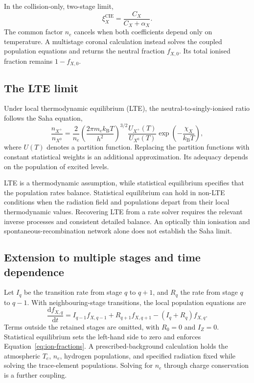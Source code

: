 In the collision-only, two-stage limit,
\begin{equation}
 \xi_X^{\mathrm{CIE}}=\frac{C_X}{C_X+\alpha_X}.
 \label{eq:ion-two-state-cie}
\end{equation}
The common factor $n_e$ cancels when both coefficients depend only on
temperature. A multistage coronal calculation instead solves the coupled
population equations and returns the neutral fraction $f_{X,0}$.
Its total ionised fraction remains $1-f_{X,0}$.

\subsection{The LTE limit}

Under local thermodynamic equilibrium (LTE), the neutral-to-singly-ionised
ratio follows the Saha equation,
\begin{equation}
 \frac{n_{X^+}}{n_{X^0}}
 =\frac{2}{n_e}
  \left(\frac{2\pi m_e k_{\mathrm B}T}{h^2}\right)^{3/2}
  \frac{U_{X^+}(T)}{U_{X^0}(T)}
  \exp\left(-\frac{\chi_X}{k_{\mathrm B}T}\right),
 \label{eq:ion-saha}
\end{equation}
where $U(T)$ denotes a partition function. Replacing the partition functions
with constant statistical weights is an additional approximation.
Its adequacy depends on the population of excited levels.

LTE is a thermodynamic assumption, while statistical equilibrium specifies
that the population rates balance. Statistical equilibrium can hold in
non-LTE conditions when the radiation field and populations depart from their
local thermodynamic values. Recovering LTE from a rate solver requires the
relevant inverse processes and consistent detailed balance. An optically thin
ionisation and spontaneous-recombination network alone does not establish
the Saha limit.

\subsection{Extension to multiple stages and time dependence}

Let $I_q$ be the transition rate from stage $q$ to $q+1$, and $R_q$ the rate
from stage $q$ to $q-1$. With neighbouring-stage transitions, the local
population equations are
\begin{equation}
 \frac{\mathrm{d}f_{X,q}}{\mathrm{d}t}
 = I_{q-1}f_{X,q-1}+R_{q+1}f_{X,q+1}
   -(I_q+R_q)f_{X,q}.
 \label{eq:ion-multistage}
\end{equation}
Terms outside the retained stages are omitted, with $R_0=0$ and $I_Z=0$.
Statistical equilibrium sets the left-hand side to zero and enforces
Equation~\eqref{eq:ion-fractions}. A prescribed-background calculation holds
the atmospheric $T_e$, $n_e$, hydrogen populations, and specified radiation
fixed while solving the trace-element populations. Solving for $n_e$ through
charge conservation is a further coupling.

